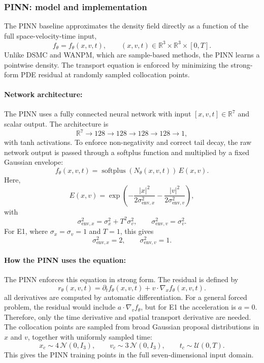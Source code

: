 \documentclass[11pt]{article}
\theoremstyle{plain}
\begin{document}
\subsubsection{PINN: model and implementation}
\label{sec:pinn}

The PINN baseline approximates the density field directly as a function of the full space-velocity-time input,
$$
f_\theta=f_\theta(x,v,t),
\qquad
(x,v,t)\in\mathbb R^3\times\mathbb R^3\times[0,T].
$$
Unlike DSMC and WANPM, which are sample-based methods, the PINN learns a pointwise density. The transport equation is enforced by minimizing the strong-form PDE residual at randomly sampled collocation points.

\paragraph{Network architecture:}
The PINN uses a fully connected neural network with input
$
[x,v,t]\in\mathbb R^7
$
and scalar output. The architecture is
$$
\mathbb R^7
\longrightarrow
128
\longrightarrow
128
\longrightarrow
128
\longrightarrow
128
\longrightarrow
1,
$$
with tanh activations. To enforce non-negativity and correct tail decay, the raw network output is passed through a softplus function and multiplied by a fixed Gaussian envelope:
\begin{equation}
f_\theta(x,v,t)
=
\operatorname{softplus}(N_\theta(x,v,t))\,E(x,v).
\label{eq:pinn_density}
\end{equation}
Here,
\begin{equation}
E(x,v)
=
\exp\left(
-\frac{|x|^2}{2\sigma_{\mathrm{env},x}^2}
-\frac{|v|^2}{2\sigma_{\mathrm{env},v}^2}
\right),
\label{eq:pinn_envelope}
\end{equation}
with
$$
\sigma_{\mathrm{env},x}^2=\sigma_x^2+T^2\sigma_v^2,
\qquad
\sigma_{\mathrm{env},v}^2=\sigma_v^2.
$$
For E1, where \(\sigma_x=\sigma_v=1\) and \(T=1\), this gives
$$
\sigma_{\mathrm{env},x}^2=2,
\qquad
\sigma_{\mathrm{env},v}^2=1.
$$

\paragraph{How the PINN uses the equation:}
The PINN enforces this equation in strong form. The residual is defined by
\begin{equation}
r_\theta(x,v,t)
=
\partial_t f_\theta(x,v,t)
+
v\cdot\nabla_x f_\theta(x,v,t).
\label{eq:pinn_residual}
\end{equation}
all derivatives are computed by automatic differentiation. For a general forced problem, the residual would include \(a\cdot\nabla_v f_\theta\), but for E1 the acceleration is $a=0.$ Therefore, only the time derivative and spatial transport derivative are needed. The collocation points are sampled from broad Gaussian proposal distributions in \(x\) and \(v\), together with uniformly sampled time:
$$
x_c\sim 4\,\mathcal N(0,I_3),
\qquad
v_c\sim 3\,\mathcal N(0,I_3),
\qquad
t_c\sim\mathcal U(0,T).
$$
This gives the PINN training points in the full seven-dimensional input domain.
\end{document}
